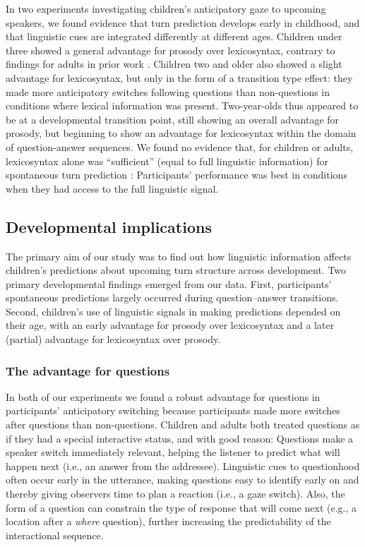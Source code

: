 \documentclass[authoryear, 12pt]{elsarticle}
\begin{document}
In two experiments investigating children's anticipatory gaze to upcoming speakers, we found evidence that turn prediction develops early in childhood, and that linguistic cues are integrated differently at different ages. Children under three showed a general advantage for prosody over lexicosyntax, contrary to findings for adults in prior work \citep{de-ruiter2006}. Children two and older also showed a slight advantage for lexicosyntax, but only in the form of a transition type effect: they made more anticipatory switches following questions than non-questions in conditions where lexical information was present. Two-year-olds thus appeared to be at a developmental transition point, still showing an overall advantage for prosody, but beginning to show an advantage for lexicosyntax within the domain of question-answer sequences. We found no evidence that, for children or adults, lexicosyntax alone was ``sufficient'' (equal to full linguistic information) for spontaneous turn prediction \citep[pg. 531]{de-ruiter2006}: Participants' performance was best in conditions when they had access to the full linguistic signal. 

\subsection{Developmental implications}

The primary aim of our study was to find out how linguistic information affects children's predictions about upcoming turn structure across development. Two primary developmental findings emerged from our data. First, participants' spontaneous predictions largely occurred during question--answer transitions. Second, children's use of linguistic signals in making predictions depended on their age, with an early advantage for prosody over lexicosyntax and a later (partial) advantage for lexicosyntax over prosody.

\subsubsection{The advantage for questions}

In both of our experiments we found a robust advantage for questions in participants' anticipatory switching because participants made more switches after questions than non-questions. Children and adults both treated questions as if they had a special interactive status, and with good reason: Questions make a speaker switch immediately relevant, helping the listener to predict what will happen next (i.e., an answer from the addressee). Linguistic cues to questionhood often occur early in the utterance, making questions easy to identify early on and thereby giving observers time to plan a reaction (i.e., a gaze switch). Also, the form of a question can constrain the type of response that will come next (e.g., a location after a \textit{where} question), further increasing the predictability of the interactional sequence.
\end{document}
